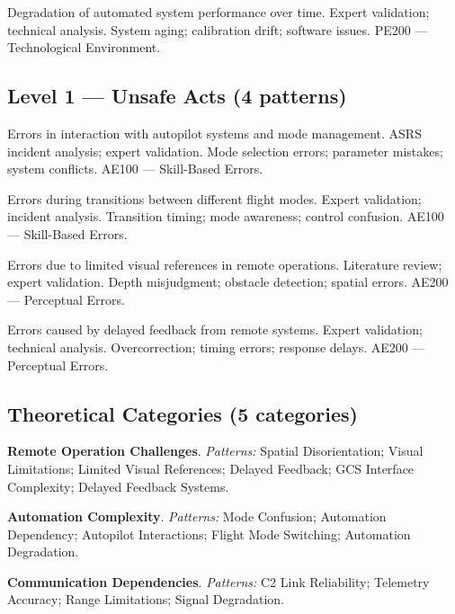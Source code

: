 {Degradation of automated system performance over time.}
{Expert validation; technical analysis.}
{System aging; calibration drift; software issues.}
{PE200 --- Technological Environment.}

\subsection*{Level 1 --- Unsafe Acts (4 patterns)}

{Errors in interaction with autopilot systems and mode management.}
{ASRS incident analysis; expert validation.}
{Mode selection errors; parameter mistakes; system conflicts.}
{AE100 --- Skill-Based Errors.}

{Errors during transitions between different flight modes.}
{Expert validation; incident analysis.}
{Transition timing; mode awareness; control confusion.}
{AE100 --- Skill-Based Errors.}

{Errors due to limited visual references in remote operations.}
{Literature review; expert validation.}
{Depth misjudgment; obstacle detection; spatial errors.}
{AE200 --- Perceptual Errors.}

{Errors caused by delayed feedback from remote systems.}
{Expert validation; technical analysis.}
{Overcorrection; timing errors; response delays.}
{AE200 --- Perceptual Errors.}

\subsection*{Theoretical Categories (5 categories)}

\noindent\textbf{Remote Operation Challenges}. \textit{Patterns:} Spatial Disorientation; Visual Limitations; Limited Visual References; Delayed Feedback; GCS Interface Complexity; Delayed Feedback Systems.\par\smallskip

\noindent\textbf{Automation Complexity}. \textit{Patterns:} Mode Confusion; Automation Dependency; Autopilot Interactions; Flight Mode Switching; Automation Degradation.\par\smallskip

\noindent\textbf{Communication Dependencies}. \textit{Patterns:} C2 Link Reliability; Telemetry Accuracy; Range Limitations; Signal Degradation.\par\smallskip

